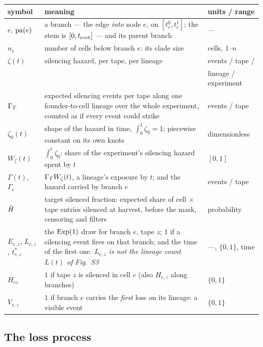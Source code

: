 \begin{center}\small
\begin{tabular}{@{}lp{}l@{}}
\toprule
symbol & meaning & units / range \\
\midrule
$e$, ${\rm pa}(e)$ & a branch --- the edge \emph{into} node $e$, on $[t_e^0,t_e^1]$; the stem is
      $[0,t_{\rm root}]$ --- and its parent branch & --- \\
$n_e$ & number of cells below branch $e$: its clade size & cells, $1$--$n$ \\
$\zeta(t)$ & silencing hazard, per tape, per lineage & events / tape /\\ & & lineage / experiment \\
$\Gamma_T$ & expected silencing events per tape along one founder-to-cell lineage over the whole
      experiment, counted as if every event could strike & events / tape \\
$\zeta_0(t)$ & shape of the hazard in time, $\int_0^1\zeta_0=1$; piecewise constant on its own knots &
      dimensionless \\
$W_\zeta(t)$ & $\int_0^t\zeta_0$: share of the experiment's silencing hazard spent by $t$ & $[0,1]$ \\
$\Gamma(t)$, $\Gamma_e$ & $\Gamma_T W_\zeta(t)$, a lineage's exposure by $t$; and the hazard carried by
      branch $e$ & events / tape \\
$\bar H$ & target silenced fraction: expected share of cell $\times$ tape entries silenced at harvest,
      before the mask, censoring and filters & probability \\
$E_{e,z}$, $L_{e,z}$, $t^*_{e,z}$ & the $\operatorname{Exp}(1)$ draw for branch $e$, tape $z$; $1$ if a silencing
      event fires on that branch; and the time of the first one. \emph{$L_{e,z}$ is not the lineage
      count $L(t)$ of Fig.~S3} & ---, $\{0,1\}$, time \\
$H_{cz}$ & $1$ if tape $z$ is silenced in cell $c$ (also $H_{e,z}$ along branches) & $\{0,1\}$ \\
$V_{e,z}$ & $1$ if branch $e$ carries the \emph{first} loss on its lineage: a visible event &
      $\{0,1\}$ \\
\bottomrule
\end{tabular}
\end{center}

\subsection{The loss process}\label{sec:loss}

